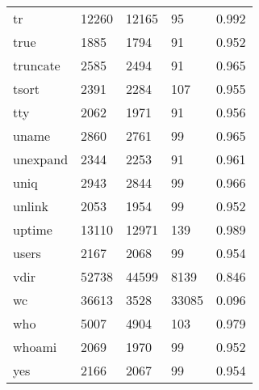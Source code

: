 \begin{longtable}{lp{3.0cm}p{3.0cm}p{3.0cm}p{3.0cm}}
tr        &                    12260 &        12165 &            95 &                    0.992 \\
true      &                     1885 &         1794 &            91 &                    0.952 \\
truncate  &                     2585 &         2494 &            91 &                    0.965 \\
tsort     &                     2391 &         2284 &           107 &                    0.955 \\
tty       &                     2062 &         1971 &            91 &                    0.956 \\
uname     &                     2860 &         2761 &            99 &                    0.965 \\
unexpand  &                     2344 &         2253 &            91 &                    0.961 \\
uniq      &                     2943 &         2844 &            99 &                    0.966 \\
unlink    &                     2053 &         1954 &            99 &                    0.952 \\
uptime    &                    13110 &        12971 &           139 &                    0.989 \\
users     &                     2167 &         2068 &            99 &                    0.954 \\
vdir      &                    52738 &        44599 &          8139 &                    0.846 \\
wc        &                    36613 &         3528 &         33085 &                    0.096 \\
who       &                     5007 &         4904 &           103 &                    0.979 \\
whoami    &                     2069 &         1970 &            99 &                    0.952 \\
yes       &                     2166 &         2067 &            99 &                    0.954 \\
\end{longtable}
